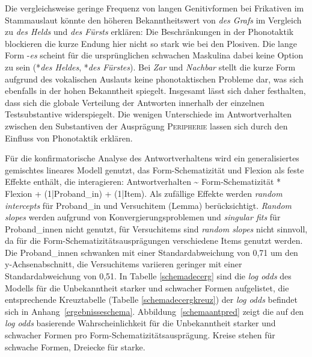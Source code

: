  
Die vergleichsweise geringe Frequenz von langen Genitivformen bei Frikativen im Stammauslaut könnte den höheren Bekanntheitswert von \textit{des Grafs} im Vergleich zu \textit{des Helds} und \textit{des Fürsts} erklären: Die Beschränkungen in der Phonotaktik blockieren die kurze Endung hier nicht so stark wie bei den Plosiven. Die lange Form -\textit{es} scheint für die ursprünglichen schwachen Maskulina dabei keine Option zu sein (*\textit{des Heldes}, *\textit{des Fürstes}).  Bei \textit{Zar} und \textit{Nachbar} stellt die kurze Form aufgrund des vokalischen Auslauts keine phonotaktischen Probleme dar, was sich ebenfalls in der hohen Bekanntheit spiegelt. Insgesamt lässt sich daher festhalten, dass sich die globale Verteilung der Antworten innerhalb der einzelnen Testsubstantive widerspiegelt. Die wenigen Unterschiede im Antwortverhalten zwischen den Substantiven der Ausprägung \textsc{Peripherie} lassen sich durch den Einfluss von Phonotaktik erklären.

Für die konfirmatorische Analyse des Antwortverhaltens wird ein generalisiertes gemischtes lineares Modell genutzt, das Form-Schematizität und Flexion als feste Effekte enthält, die interagieren: Antwortverhalten \~{} Form-Schematizität * Flexion + (1|Proband\_in) + (1|Item). Als zufällige Effekte werden \textit{random intercepts} für Proband\_in und Versuch\-item (Lemma) berücksichtigt. \textit{Random slopes} werden aufgrund von Konvergierungsproblemen und \textit{singular fits} für Pro\-\mbox{band\_in}\-nen nicht genutzt, für Versuchitems sind \textit{random slopes} nicht sinnvoll, da für die Form-Schematizitätsausprägungen verschiedene Items genutzt werden. Die Proband\_innen schwanken mit einer Standardabweichung von 0,71 um den y-Achsenabschnitt, die Versuchitems variieren geringer mit einer Standardabweichung von 0,51. In Tabelle \ref{schemadecerg} sind die \textit{log odds} des Modells für die Unbekanntheit starker und schwacher Formen aufgelistet, die entsprechende Kreuztabelle (Tabelle \ref{schemadecergkreuz}) der \textit{log odds} befindet sich in Anhang~\ref{ergebnisseschema}. Abbildung~\ref{schemaantpred} zeigt die auf den \textit{log odds} basierende Wahrscheinlichkeit für die Unbekanntheit starker und schwacher Formen pro Form-Schematizitätsausprägung. Kreise stehen für schwache Formen, Dreiecke für starke.

